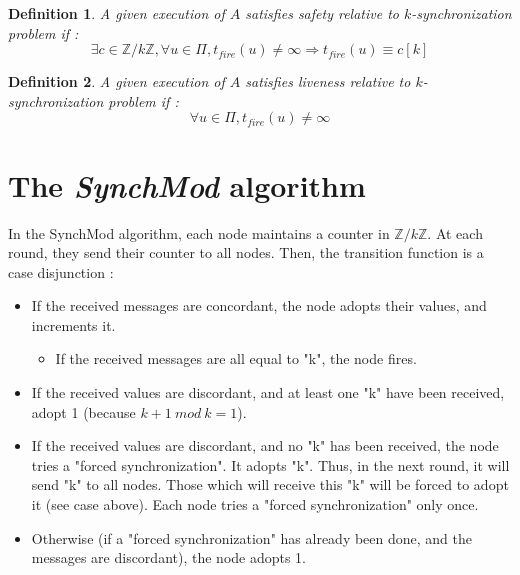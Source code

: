 \documentclass{article}
\newtheorem{definition}{Definition}
\begin{document}
\begin{definition}
	A given execution of $A$ satisfies safety relative to $k$-synchronization problem if :
	$$\exists c \in \mathds{Z}/k\mathds{Z}, \forall u \in \Pi,
	t_{fire}(u) \neq \infty \Rightarrow t_{fire}(u) \equiv c[k]$$
\end{definition}

\begin{definition}
	A given execution of $A$ satisfies liveness relative to $k$-synchronization problem if :
	$$\forall u \in \Pi, t_{fire}(u) \neq \infty$$
\end{definition}

\section{The \textit{SynchMod} algorithm}

In the SynchMod algorithm, each node maintains a counter in $\mathds{Z}/k\mathds{Z}$. At each round,
they send their counter to all nodes.
Then, the transition function is a case disjunction :
\begin{itemize}
	\item If the received messages are concordant, the node adopts their values, and increments it.
		\begin{itemize}
			\item If the received messages are all equal to "k", the node fires.
		\end{itemize}
	\item If the received values are discordant, and at least one "k" have been received, adopt 1 (because $k+1~mod~k = 1$).
	\item If the received values are discordant, and no "k" has been received, the node tries a "forced synchronization". It adopts "k".
		Thus, in the next round, it will send "k" to all nodes. Those which will receive this "k" will be forced to adopt it (see case above).
		Each node tries a "forced synchronization" only once.
	\item Otherwise (if a "forced synchronization" has already been done, and the messages are discordant), the node adopts 1.
\end{itemize}
\end{document}
